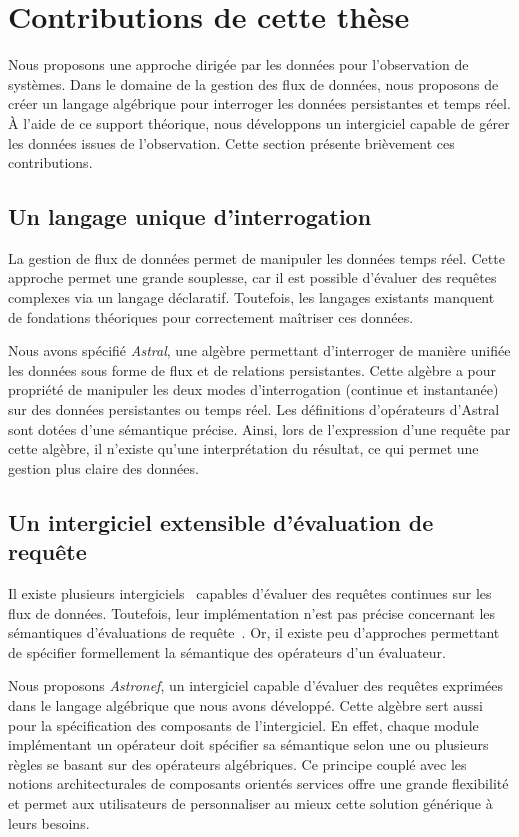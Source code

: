 \section{Contributions de cette thèse}\label{sec:intro:demarche}
Nous proposons une approche dirigée par les données pour l'observation de systèmes. Dans le domaine de la gestion des flux de données, nous proposons de créer un langage algébrique pour interroger les données persistantes et temps réel. À l'aide de ce support théorique, nous développons un intergiciel capable de gérer les données issues de l'observation. Cette section présente brièvement ces contributions.

\subsection{Un langage unique d'interrogation}
La gestion de flux de données permet de manipuler les données temps réel. Cette approche permet une grande souplesse, car il est possible d'évaluer des requêtes complexes via un langage déclaratif. Toutefois, les langages existants manquent de fondations théoriques pour correctement maîtriser ces données.

Nous avons spécifié \textit{Astral}, une algèbre permettant d'interroger de manière unifiée les données sous forme de flux et de relations persistantes. Cette algèbre a pour propriété de manipuler les deux modes d'interrogation (continue et instantanée) sur des données persistantes ou temps réel. Les définitions d'opérateurs d'Astral sont dotées d'une sémantique précise. Ainsi, lors de l'expression d'une requête par cette algèbre, il n'existe qu'une interprétation du résultat, ce qui permet une gestion plus claire des données.

\subsection{Un intergiciel extensible d'évaluation de requête}
Il existe plusieurs intergiciels~\cite{Arasu:stream,url:aleri} capables d'évaluer des requêtes continues sur les flux de données. Toutefois, leur implémentation n'est pas précise concernant les sémantiques d'évaluations de requête~\cite{Jain:spread,Botan:secret}. Or, il existe peu d'approches permettant de spécifier formellement la sémantique des opérateurs d'un évaluateur.

Nous proposons \textit{Astronef}, un intergiciel capable d'évaluer des requêtes exprimées dans le langage algébrique que nous avons développé. Cette algèbre sert aussi pour la spécification des composants de l'intergiciel. En effet, chaque module implémentant un opérateur doit spécifier sa sémantique selon une ou plusieurs règles se basant sur des opérateurs algébriques. Ce principe couplé avec les notions architecturales de composants orientés services offre une grande flexibilité et permet aux utilisateurs de personnaliser au mieux cette solution générique à leurs besoins.

